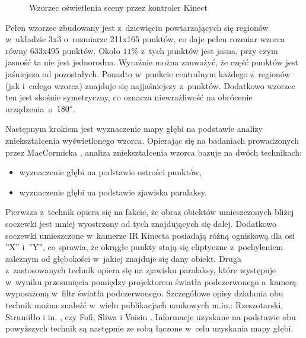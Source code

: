 \begin{savenotes}
\begin{figure}[!htb]
\begin{minipage}[b]{0.48\linewidth}
			\caption[Wzorzec oświetlenia sceny przez kontroler Kinect]{Wzorzec oświetlenia sceny przez kontroler Kinect}
			\label{fig:characteristics:kinect:dotPattern}
		\end{minipage}	
	\end{figure}
\end{savenotes}
																																	
Pełen wzorzec zbudowany jest z~dziewięciu powtarzających się regionów w~układzie 3x3 o~rozmiarze 211x165 punktów, co daje pełen rozmiar wzorca równy 633x495 punktów. Około $11\%$ z~tych punktów jest jasna, przy czym jasność ta nie jest jednorodna. Wyraźnie można zauważyć, że część punktów jest jaśniejsza od pozostałych. Ponadto w~punkcie centralnym każdego z~regionów (jak i~całego wzorca) znajduje się najjaśniejszy z~punktów. Dodatkowo wzorzec ten jest skośnie symetryczny, co oznacza niewrażliwość na obrócenie urządzenia~o~$180\degree$.
																																	
Następnym krokiem jest wyznaczenie mapy głębi na podstawie analizy zniekształcenia wyświetlonego wzorca. Opierając się na badaniach prowadzonych przez MacCormicka \cite{MacCormick2011}, analiza zniekształcenia wzorca bazuje na dwóch technikach:
																																	
\begin{itemize}
	\item wyznaczenie głębi na podstawie ostrości punktów,
	\item wyznaczenie głębi na podstawie zjawiska paralaksy.
\end{itemize}
																																	
Pierwsza z~technik opiera się na fakcie, że obraz obiektów umieszczonych bliżej soczewki jest mniej wyostrzony od tych znajdujących się dalej. Dodatkowo soczewki umieszczone w~kamerze IR Kinecta posiadają różną ogniskową dla osi ''X'' i~''Y'', co sprawia, że okrągłe punkty stają się eliptyczne z~pochyleniem zależnym od głębokości w~jakiej znajduje się dany obiekt. Druga z~zastosowanych technik opiera się na zjawisku paralaksy, które występuje w~wyniku przesunięcia pomiędzy projektorem światła podczerwonego a~kamerą wyposażoną w~filtr światła podczerwonego. Szczegółowe opisy działania obu technik można znaleźć w~wielu publikacjach naukowych m.in.: Rzeszotarski, Strumiłło i in. \cite{Rzeszotarski2006}, czy Fofi, Sliwa i Voisin \cite{Fofi2004}. Informacje uzyskane na podstawie obu powyższych technik są następnie ze sobą łączone w~celu uzyskania mapy głębi.
																																	
